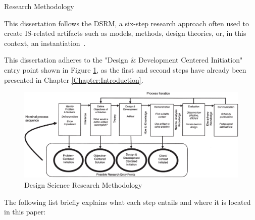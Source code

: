 \documentclass[12pt, reqno]{amsbook}
\makeatletter
\def\section{\@startsection{section}{1}%
      \z@{.5\linespacing\@plus.7\linespacing}{.25\linespacing}%
      {\normalfont\bfseries\flushleft}}
\theoremstyle{definition}
\theoremstyle{definition}
\numberwithin{section}{chapter}
\numberwithin{table}{chapter}
\numberwithin{figure}{chapter}
\makeatother
\begin{document}
\section{Research Methodology}
\label{Section:Research_Methodology}

This dissertation follows the \ac{DSRM}, a six-step research approach often used to create \ac{IS}-related artifacts such as models, methods, design theories, or, in this context, an instantiation~\cite{Peffers2007}.

This dissertation adheres to the "Design \& Development Centered Initiation" entry point shown in Figure \ref{Figure:DSRM}, as the first and second steps have already been presented in Chapter \ref{Chapter:Introduction}.

\begin{figure}[H]
  \centering
  \includegraphics[width=1\linewidth]{images/DSRM_process_model.png}
  \caption{\label{Figure:DSRM}Design Science Research Methodology~\cite{Peffers2007}}
\end{figure}

The following list briefly explains what each step entails and where it is located in this paper:
\end{document}
